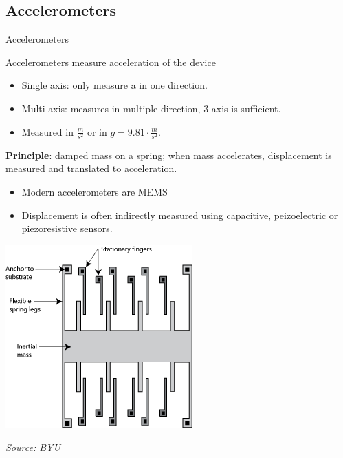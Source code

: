 \documentclass[compress]{beamer}
\newcommand{\source}[2]{{\tiny\it Source: \href{#1}{#2}}}
\begin{document}
\subsection{Accelerometers}
\begin{frame}{Accelerometers}

Accelerometers measure acceleration of the device

\begin{itemize}

\item Single axis: only measure a in one direction.
\item Multi axis: measures in multiple direction, 3 axis is sufficient.
\item Measured in $\frac{m}{s^2}$ or in $g = 9.81\cdot\frac{m}{s^2}$.
\end{itemize}

{\bf Principle}: damped mass on a spring; when mass accelerates,
displacement is measured and translated to acceleration.

\begin{multicols}{2}
\begin{itemize}

\item Modern accelerometers are MEMS

\item Displacement is often indirectly measured using capacitive, peizoelectric
    or \href{http://en.wikipedia.org/wiki/Piezoresistive_effect}{piezoresistive}
    sensors.

    \vfill
    \columnbreak

\end{itemize}

    \begin{center}
        \includegraphics[width=0.6\linewidth]{accelero}

\source{http://research.et.byu.edu/llhwww/intro/memsintro.html}{BYU}
    \end{center}
\end{multicols}



\end{frame}
\end{document}
